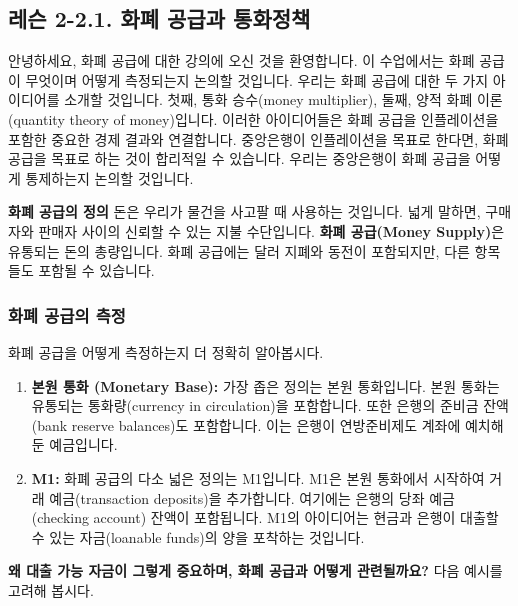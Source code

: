 \documentclass[11pt,a4paper]{article}
\begin{document}
\subsection{레슨 2-2.1. 화폐 공급과 통화정책}

안녕하세요, 화폐 공급에 대한 강의에 오신 것을 환영합니다. 이 수업에서는 화폐 공급이 무엇이며 어떻게 측정되는지 논의할 것입니다. 우리는 화폐 공급에 대한 두 가지 아이디어를 소개할 것입니다. 첫째, 통화 승수(money multiplier), 둘째, 양적 화폐 이론(quantity theory of money)입니다. 이러한 아이디어들은 화폐 공급을 인플레이션을 포함한 중요한 경제 결과와 연결합니다. 중앙은행이 인플레이션을 목표로 한다면, 화폐 공급을 목표로 하는 것이 합리적일 수 있습니다. 우리는 중앙은행이 화폐 공급을 어떻게 통제하는지 논의할 것입니다.

\begin{conceptbox}
\textbf{화폐 공급의 정의}
돈은 우리가 물건을 사고팔 때 사용하는 것입니다. 넓게 말하면, 구매자와 판매자 사이의 신뢰할 수 있는 지불 수단입니다. \textbf{화폐 공급(Money Supply)}은 유통되는 돈의 총량입니다. 화폐 공급에는 달러 지폐와 동전이 포함되지만, 다른 항목들도 포함될 수 있습니다.
\end{conceptbox}

\subsubsection*{화폐 공급의 측정}
화폐 공급을 어떻게 측정하는지 더 정확히 알아봅시다.

\begin{enumerate}
    \item \textbf{본원 통화 (Monetary Base):} 가장 좁은 정의는 본원 통화입니다. 본원 통화는 유통되는 통화량(currency in circulation)을 포함합니다. 또한 은행의 준비금 잔액(bank reserve balances)도 포함합니다. 이는 은행이 연방준비제도 계좌에 예치해 둔 예금입니다.
    \item \textbf{M1:} 화폐 공급의 다소 넓은 정의는 M1입니다. M1은 본원 통화에서 시작하여 거래 예금(transaction deposits)을 추가합니다. 여기에는 은행의 당좌 예금(checking account) 잔액이 포함됩니다. M1의 아이디어는 현금과 은행이 대출할 수 있는 자금(loanable funds)의 양을 포착하는 것입니다.
\end{enumerate}

\textbf{왜 대출 가능 자금이 그렇게 중요하며, 화폐 공급과 어떻게 관련될까요?}
다음 예시를 고려해 봅시다.
\end{document}
